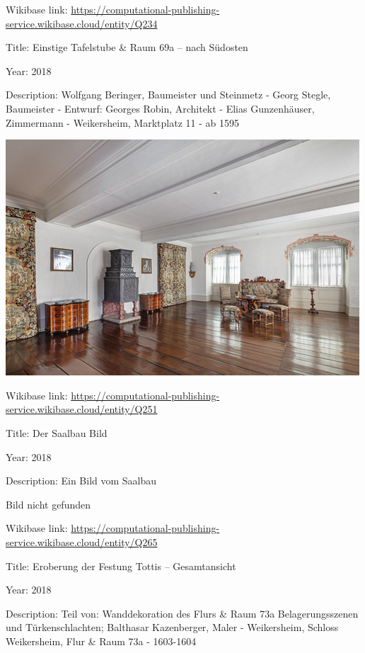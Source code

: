 \documentclass[
  letterpaper,
]{book}
\begin{document}
Wikibase link:
\url{https://computational-publishing-service.wikibase.cloud/entity/Q234}

Title: Einstige Tafelstube \& Raum 69a -- nach Südosten

Year: 2018

Description: Wolfgang Beringer, Baumeister und Steinmetz - Georg Stegle,
Baumeister - Entwurf: Georges Robin, Architekt - Elias Gunzenhäuser,
Zimmermann - Weikersheim, Marktplatz 11 - ab 1595

\includegraphics{paintings_files/figure-pdf/cell-3-output-22.png}

Wikibase link:
\url{https://computational-publishing-service.wikibase.cloud/entity/Q251}

Title: Der Saalbau Bild

Year: 2018

Description: Ein Bild vom Saalbau

Bild nicht gefunden

Wikibase link:
\url{https://computational-publishing-service.wikibase.cloud/entity/Q265}

Title: Eroberung der Festung Tottis -- Gesamtansicht

Year: 2018

Description: Teil von: Wanddekoration des Flurs \& Raum 73a
Belagerungsszenen und Türkenschlachten; Balthasar Kazenberger, Maler -
Weikersheim, Schloss Weikersheim, Flur \& Raum 73a - 1603-1604
\end{document}
